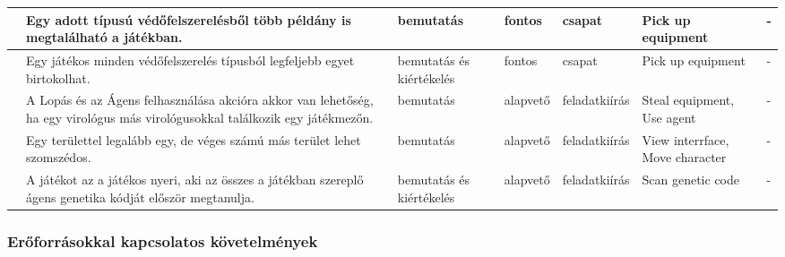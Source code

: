 \begin{xltabular}{\textwidth}{| X | p{4cm} | p{2cm} | p{1.8cm} | p{1.3cm} | p{2cm} | X |}
	\azonosito &
	Egy adott típusú védőfelszerelésből több példány is megtalálható a játékban. &
	bemutatás &
	fontos &
	csapat &
	Pick up equipment &
	- \\
	\hline

	\azonosito &
	Egy játékos minden védőfelszerelés típusból legfeljebb egyet birtokolhat. &
	bemutatás és kiértékelés &
	fontos &
	csapat &
	Pick up equipment &
	- \\
	\hline

	\azonosito &
	A Lopás és az Ágens felhasználása akcióra akkor van lehetőség, ha egy virológus más virológusokkal találkozik egy játékmezőn. &
	bemutatás &
	alapvető &
	feladatkiírás &
	Steal equipment, Use agent &
	- \\
	\hline

	\azonosito &
	Egy területtel legalább egy, de véges számú más terület lehet szomszédos. &
	bemutatás &
	alapvető &
	feladatkiírás &
	View interrface, Move character &
	- \\
	\hline

	\azonosito &
	A játékot az a játékos nyeri, aki az összes a játékban szereplő ágens genetika kódját először megtanulja. &
	bemutatás és kiértékelés &
	alapvető &
	feladatkiírás &
	Scan genetic code &
	- \\

	\hline
\end{xltabular}

\subsubsection{Erőforrásokkal kapcsolatos követelmények}

